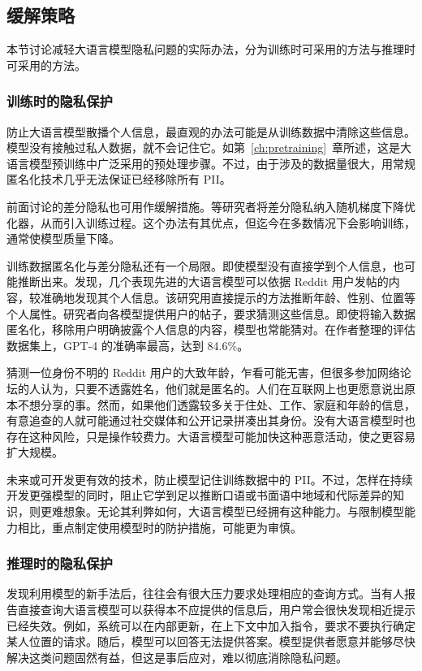 \subsection{缓解策略}
本节讨论减轻大语言模型隐私问题的实际办法，分为训练时可采用的方法与推理时可采用的方法。

\subsubsection{训练时的隐私保护}
防止大语言模型散播个人信息，最直观的办法可能是从训练数据中清除这些信息。模型没有接触过私人数据，就不会记住它。如第~\ref{ch:pretraining}~章所述，这是大语言模型预训练中广泛采用的预处理步骤。不过，由于涉及的数据量很大，用常规匿名化技术几乎无法保证已经移除所有 PII。

前面讨论的差分隐私也可用作缓解措施。等研究者将差分隐私纳入随机梯度下降优化器，从而引入训练过程。这个办法有其优点，但迄今在多数情况下会影响训练，通常使模型质量下降。

训练数据匿名化与差分隐私还有一个局限。即使模型没有直接学到个人信息，也可能推断出来。发现，几个表现先进的大语言模型可以依据 Reddit 用户发帖的内容，较准确地发现其个人信息。该研究用直接提示的方法推断年龄、性别、位置等个人属性。研究者向各模型提供用户的帖子，要求猜测这些信息。即使将输入数据匿名化，移除用户明确披露个人信息的内容，模型也常能猜对。在作者整理的评估数据集上，GPT-4 的准确率最高，达到 84.6\%。

猜测一位身份不明的 Reddit 用户的大致年龄，乍看可能无害，但很多参加网络论坛的人认为，只要不透露姓名，他们就是匿名的。人们在互联网上也更愿意说出原本不想分享的事。然而，如果他们透露较多关于住处、工作、家庭和年龄的信息，有意追查的人就可能通过社交媒体和公开记录拼凑出其身份。没有大语言模型时也存在这种风险，只是操作较费力。大语言模型可能加快这种恶意活动，使之更容易扩大规模。

未来或可开发更有效的技术，防止模型记住训练数据中的 PII。不过，怎样在持续开发更强模型的同时，阻止它学到足以推断口语或书面语中地域和代际差异的知识，则更难想象。无论其利弊如何，大语言模型已经拥有这种能力。与限制模型能力相比，重点制定使用模型时的防护措施，可能更为审慎。

\subsubsection{推理时的隐私保护}
发现利用模型的新手法后，往往会有很大压力要求处理相应的查询方式。当有人报告直接查询大语言模型可以获得本不应提供的信息后，用户常会很快发现相近提示已经失效。例如，系统可以在内部更新，在上下文中加入指令，要求不要执行确定某人位置的请求。随后，模型可以回答无法提供答案。模型提供者愿意并能够尽快解决这类问题固然有益，但这是事后应对，难以彻底消除隐私问题。

